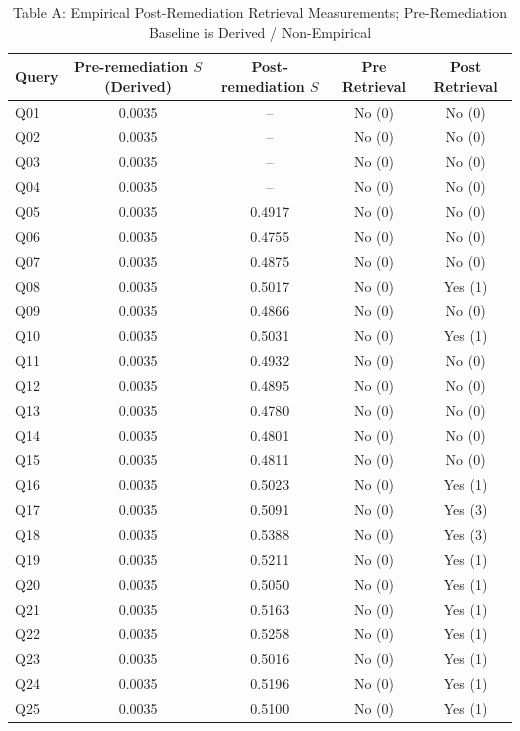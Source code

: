 \begin{table}[t]
\centering
\caption{Table A: Empirical Post-Remediation Retrieval Measurements; Pre-Remediation Baseline is Derived / Non-Empirical}
\label{tab:fig3_validation}
\setlength{\tabcolsep}{4.0pt}
\footnotesize
\begin{tabular}{lcccc}
\toprule
\textbf{Query} & \textbf{Pre-remediation $S$ (Derived)} & \textbf{Post-remediation $S$} & \textbf{Pre Retrieval} & \textbf{Post Retrieval} \\
\midrule
Q01 & 0.0035 & -- & No (0) & No (0) \\
Q02 & 0.0035 & -- & No (0) & No (0) \\
Q03 & 0.0035 & -- & No (0) & No (0) \\
Q04 & 0.0035 & -- & No (0) & No (0) \\
Q05 & 0.0035 & 0.4917 & No (0) & No (0) \\
Q06 & 0.0035 & 0.4755 & No (0) & No (0) \\
Q07 & 0.0035 & 0.4875 & No (0) & No (0) \\
Q08 & 0.0035 & 0.5017 & No (0) & Yes (1) \\
Q09 & 0.0035 & 0.4866 & No (0) & No (0) \\
Q10 & 0.0035 & 0.5031 & No (0) & Yes (1) \\
Q11 & 0.0035 & 0.4932 & No (0) & No (0) \\
Q12 & 0.0035 & 0.4895 & No (0) & No (0) \\
Q13 & 0.0035 & 0.4780 & No (0) & No (0) \\
Q14 & 0.0035 & 0.4801 & No (0) & No (0) \\
Q15 & 0.0035 & 0.4811 & No (0) & No (0) \\
Q16 & 0.0035 & 0.5023 & No (0) & Yes (1) \\
Q17 & 0.0035 & 0.5091 & No (0) & Yes (3) \\
Q18 & 0.0035 & 0.5388 & No (0) & Yes (3) \\
Q19 & 0.0035 & 0.5211 & No (0) & Yes (1) \\
Q20 & 0.0035 & 0.5050 & No (0) & Yes (1) \\
Q21 & 0.0035 & 0.5163 & No (0) & Yes (1) \\
Q22 & 0.0035 & 0.5258 & No (0) & Yes (1) \\
Q23 & 0.0035 & 0.5016 & No (0) & Yes (1) \\
Q24 & 0.0035 & 0.5196 & No (0) & Yes (1) \\
Q25 & 0.0035 & 0.5100 & No (0) & Yes (1) \\
\midrule

\end{tabular}
\end{table}
